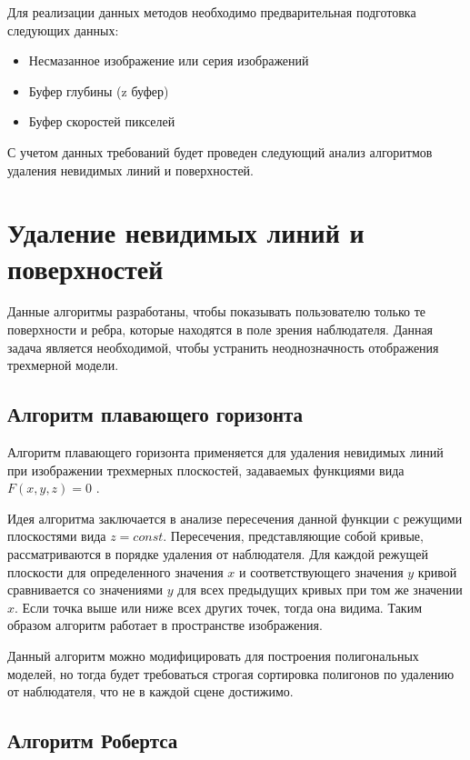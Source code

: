 \par
Для реализации данных методов необходимо предварительная подготовка следующих данных:
\begin{itemize}
    \item Несмазанное изображение или серия изображений
    \item Буфер глубины (z буфер)
    \item Буфер скоростей пикселей  
\end{itemize}
\par 
С учетом данных требований будет проведен следующий анализ алгоритмов удаления невидимых линий и поверхностей.


\section{Удаление невидимых линий и поверхностей}

Данные алгоритмы разработаны, чтобы показывать пользователю только те поверхности и ребра, которые находятся в поле зрения наблюдателя. Данная задача является необходимой, чтобы устранить неоднозначность отображения трехмерной модели.

\subsection{Алгоритм плавающего горизонта}

Алгоритм плавающего горизонта применяется для удаления невидимых линий при изображении трехмерных плоскостей, задаваемых функциями вида $F(x,y,z) = 0$  \cite[c. 233]{Rogers89}. 
\par
Идея алгоритма заключается в анализе пересечения данной функции с режущими плоскостями вида $z = const$. Пересечения, представляющие собой кривые, рассматриваются в порядке удаления от наблюдателя. Для каждой режущей плоскости для определенного значения $x$  и соответствующего значения $y$ кривой сравнивается со значениями $y$ для всех предыдущих кривых при том же значении $x$. Если точка выше или ниже всех других точек, тогда она видима. Таким образом алгоритм работает в пространстве изображения.
\par
Данный алгоритм можно модифицировать для построения полигональных моделей, но тогда будет требоваться строгая сортировка полигонов по удалению от наблюдателя, что не в каждой сцене достижимо.

\subsection{Алгоритм Робертса}


